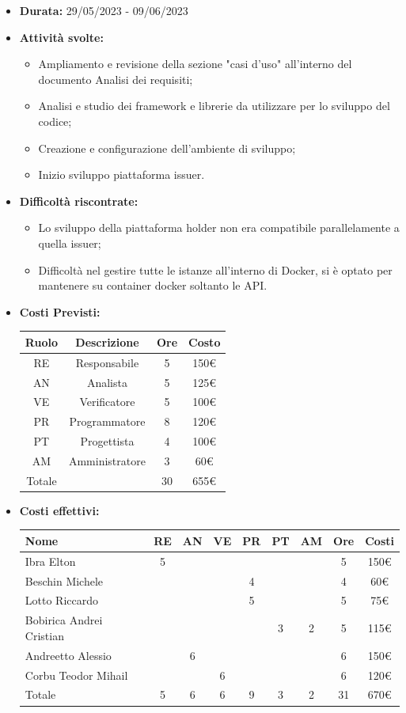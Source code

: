 \begin{itemize}
\item \textbf{Durata:} 29/05/2023 - 09/06/2023 
\item \textbf{Attività svolte:}
\begin{itemize}
    \item Ampliamento e revisione della sezione "casi d'uso" all'interno del documento Analisi dei requisiti;
    \item Analisi e studio dei framework e librerie da utilizzare per lo sviluppo del codice;
    \item Creazione e configurazione dell'ambiente di sviluppo;
    \item Inizio sviluppo piattaforma issuer.
\end{itemize}
\item \textbf{Difficoltà riscontrate:}
\begin{itemize}
    \item Lo sviluppo della piattaforma holder non era compatibile parallelamente a quella issuer; 
    \item Difficoltà nel gestire tutte le istanze all'interno di Docker\glo, si è optato per mantenere su container docker soltanto le API.
\end{itemize}
\newpage
\item \textbf{Costi Previsti:}
\begin{longtable}{|c|c|c|c|}
    \hline
    Ruolo & Descrizione & Ore & Costo \\
    \hline
    RE & Responsabile & 5 & 150€ \\
    \hline
    AN & Analista & 5 & 125€ \\
    \hline
    VE & Verificatore & 5 & 100€ \\
    \hline
    PR & Programmatore & 8 & 120€ \\
    \hline
    PT & Progettista & 4 & 100€ \\
    \hline
    AM & Amministratore & 3 & 60€ \\
    \hline
    Totale & & 30 & 655€ \\
    \hline
    \end{longtable}
\item \textbf{Costi effettivi:}
\begin{longtable}{|p{}|c|c|c|c|c|c|c|c|}
    \hline
    Nome & RE & AN & VE & PR & PT & AM & Ore & Costi\\
    \hline
    Ibra Elton &5 & & & & & &5 & 150€\\
    \hline
    Beschin Michele & & & &4 & & &4 & 60€ \\
    \hline
    Lotto \newline  Riccardo & & & &5 & & &5& 75€ \\
    \hline
    Bobirica Andrei Cristian & & & & &3 &2 &5 & 115€\\
    \hline
    Andreetto Alessio & &6 & & & & &6 & 150€\\
    \hline
    Corbu Teodor Mihail & & &6 & & & &6 & 120€\\
    \hline
    Totale &5 &6 &6 &9 &3 &2 &31& 670€\\
    \hline
\end{longtable}
\end{itemize}


